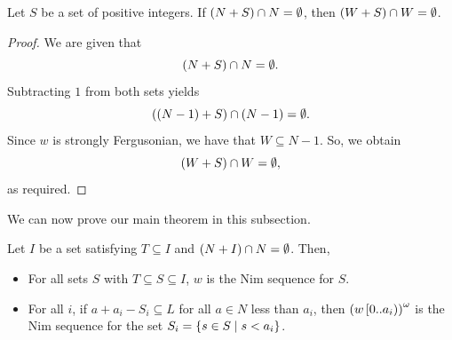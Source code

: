 \documentclass[english,12pt]{article}
\begin{document}
\begin{lemma}\label{lem:vsv0}
Let $S$ be a set of positive integers.
If $\left(N+S\right)\cap N=\emptyset$, then $\left(W+S\right)\cap W=\emptyset$.
\end{lemma}
\begin{proof}
We are given that
\[
\left(N+S\right)\cap N=\emptyset.
\]
Subtracting $1$ from both sets yields
\[
\left(\left(N-1\right)+S\right)\cap\left(N-1\right)=\emptyset.
\]
Since $w$ is strongly Fergusonian, we have that $W\subseteq N-1$.  So, we obtain
\[
\left(W+S\right)\cap W=\emptyset,
\]
as required.
\end{proof}
We can now prove our main theorem in this subsection.
\begin{theorem}\label{thm:absmain}
Let $I$ be a set
satisfying $T\subseteq I
$ and $\left(N+I\right)\cap N=\emptyset$.  Then,
\begin{itemize}
\item For all sets $S$ with $T\subseteq S\subseteq I$, $w$ is the Nim sequence for $S$.
\item For all $i$, if $a+a_i-S_i\subseteq L$ for all $a\in N$ less than $a_i$, then $\left(w\left[0..a_i\right)\right)^\omega$ is the Nim sequence for the set $S_i=\left\{s\in S\mid s<a_i\right\}$.
\end{itemize}
\end{theorem}
\end{document}
